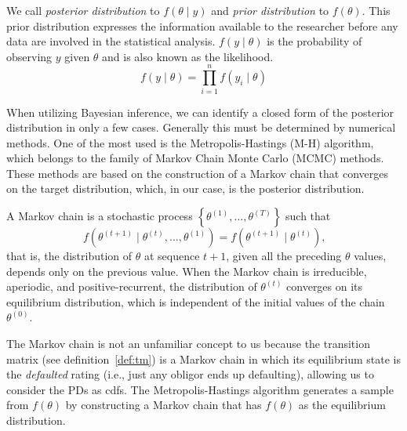 \documentclass[11pt,fleqn]{book} %
\begin{document}
We call \emph{posterior distribution} to $f(\theta \mid y)$ and 
\emph{prior distribution} to $f(\theta)$. This prior distribution 
expresses the information available to the researcher before 
any data are involved in the statistical analysis. $f(y \mid \theta)$ 
is the probability of observing $y$ given $\theta$ and is also 
known as the likelihood.
\begin{displaymath}
	f(y \mid \theta) = \prod_{i=1}^n f(y_i \mid \theta)
\end{displaymath}

When utilizing Bayesian inference, we can identify a closed form of the 
posterior distribution in only a few cases. Generally this must be determined 
by numerical methods. One of the most used is the Metropolis-Hastings (M-H)
algorithm, which belongs to the family of Markov Chain Monte Carlo (MCMC) 
methods. These methods are based on the construction of a Markov chain that 
converges on the target distribution, which, in our case, is the posterior 
distribution.

\begin{definition}
	A Markov chain is a stochastic process 
	$\left\{\theta^{(1)},\dots,\theta^{(T)}\right\}$ such that
	\begin{displaymath}
		f\left(\theta^{(t+1)} \mid \theta^{(t)},\dots,\theta^{(1)}\right) = 
		f\left(\theta^{(t+1)} \mid \theta^{(t)}\right)
		\text{,}
	\end{displaymath}
	that is, the distribution of $\theta$ at sequence $t+1$, given all the 
	preceding $\theta$ values, depends only on the previous value. 
	When the Markov chain is irreducible, aperiodic, and positive-recurrent, 
	the distribution of $\theta^{(t)}$ converges on its equilibrium 
	distribution, which is independent of the initial values of the chain 
	$\theta^{(0)}$.
\end{definition}

The Markov chain is not an unfamiliar concept to us because the transition 
matrix (see definition~\ref{def:tm}) is a Markov chain in which its 
equilibrium state is the \emph{defaulted} rating (i.e., just any 
obligor ends up defaulting), allowing us to consider the PDs as cdfs.
The Metropolis-Hastings algorithm generates a sample from $f(\theta)$ 
by constructing a Markov chain that has $f(\theta)$ as the equilibrium 
distribution.
\end{document}
